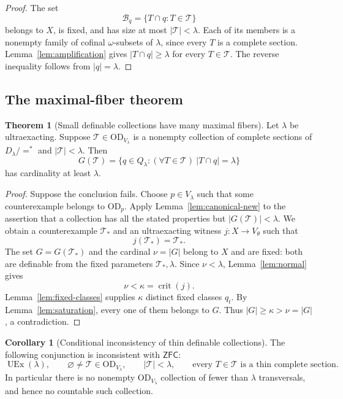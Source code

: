 \documentclass[11pt,letterpaper]{article}
\theoremstyle{definition}
\newtheorem{theorem}[definition]{Theorem}
\newtheorem{corollary}[definition]{Corollary}
\numberwithin{equation}{section}
\newcommand{\ZFC}{\mathsf{ZFC}}
\newcommand{\OD}{\mathrm{OD}}
\newcommand{\UEx}{\operatorname{UEx}}
\newcommand{\crit}{\operatorname{crit}}
\newcommand{\Tcal}{\mathcal T}
\newcommand{\Bcal}{\mathcal B}
\begin{document}
\begin{proof}
The set
\[
\Bcal_q=\{T\cap q:T\in\Tcal\}
\]
belongs to $X$, is fixed, and has size at most $|\Tcal|<\lambda$. Each of its members is a nonempty family of cofinal $\omega$-subsets of $\lambda$, since every $T$ is a complete section. Lemma~\ref{lem:amplification} gives $|T\cap q|\ge\lambda$ for every $T\in\Tcal$. The reverse inequality follows from $|q|=\lambda$.
\end{proof}

\subsection{The maximal-fiber theorem}

\begin{samepage}
\begin{theorem}[Small definable collections have many maximal fibers]\label{thm:maximal}
Let $\lambda$ be ultraexacting. Suppose $\Tcal\in\OD_{V_\lambda}$ is a nonempty collection of complete sections of $D_\lambda/{=^*}$ and $|\Tcal|<\lambda$. Then
\[
G(\Tcal)=\{q\in Q_\lambda:(\forall T\in\Tcal)\ |T\cap q|=\lambda\}
\]
has cardinality at least $\lambda$.
\end{theorem}
\end{samepage}

\begin{proof}
Suppose the conclusion fails. Choose $p\in V_\lambda$ such that some counterexample belongs to $\OD_p$. Apply Lemma~\ref{lem:canonical-new} to the assertion that a collection has all the stated properties but $|G(\Tcal)|<\lambda$. We obtain a counterexample $\Tcal_*$ and an ultraexacting witness $j:X\to V_\theta$ such that
\[
j(\Tcal_*)=\Tcal_*.
\]
The set $G=G(\Tcal_*)$ and the cardinal $\nu=|G|$ belong to $X$ and are fixed: both are definable from the fixed parameters $\Tcal_*,\lambda$. Since $\nu<\lambda$, Lemma~\ref{lem:normal} gives
\[
\nu<\kappa=\crit(j).
\]
Lemma~\ref{lem:fixed-classes} supplies $\kappa$ distinct fixed classes $q_t$. By Lemma~\ref{lem:saturation}, every one of them belongs to $G$. Thus $|G|\ge\kappa>\nu=|G|$, a contradiction.
\end{proof}

\begin{corollary}[Conditional inconsistency of thin definable collections]\label{cor:thin}
The following conjunction is inconsistent with $\ZFC$:
\[
\UEx(\lambda),\qquad
\varnothing\ne\Tcal\in\OD_{V_\lambda},\qquad
|\Tcal|<\lambda,\qquad
\text{every }T\in\Tcal\text{ is a thin complete section.}
\]
In particular there is no nonempty $\OD_{V_\lambda}$ collection of fewer than $\lambda$ transversals, and hence no countable such collection.
\end{corollary}
\end{document}
